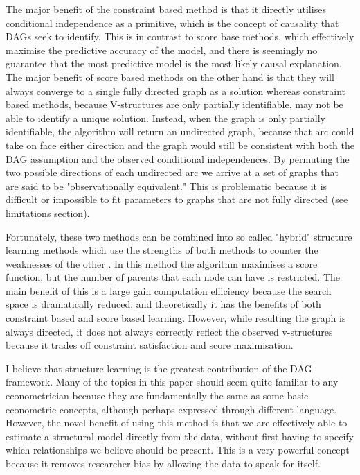 \documentclass{article}
\begin{document}
The major benefit of the constraint based method is that it directly utilises conditional independence as a primitive, which is the concept of causality that DAGs seek to identify. This is in contrast to score base methods, which effectively maximise the predictive accuracy of the model, and there is seemingly no guarantee that the most predictive model is the most likely causal explanation. The major benefit of score based methods on the other hand is that they will always converge to a single fully directed graph as a solution whereas constraint based methods, because V-structures are only partially identifiable, may not be able to identify a unique solution. Instead, when the graph is only partially identifiable, the algorithm will return an undirected graph, because that arc could take on face either direction and the graph would still be consistent with both the DAG assumption and the observed conditional independences. By permuting the two possible directions of each undirected arc we arrive at a set of graphs that are said to be "observationally equivalent." This is problematic because it is difficult or impossible to fit parameters to graphs that are not fully directed (see limitations section).  

Fortunately, these two methods can be combined into so called "hybrid" structure learning methods which use the strengths of both methods to counter the weaknesses of the other \parencite{scutari2014multiple} \parencite{friedman2013learning}. In this method the algorithm maximises a score function, but the number of parents that each node can have is restricted. The main benefit of this is a large gain computation efficiency because the search space is dramatically reduced, and theoretically it has the benefits of both constraint based and score based learning. However, while resulting the graph is always directed, it does not always correctly reflect the observed v-structures because it trades off constraint satisfaction and score maximisation.

I believe that structure learning is the greatest contribution of the DAG framework. Many of the topics in this paper should seem quite familiar to any econometrician because they are fundamentally the same as some basic econometric concepts, although perhaps expressed through different language. However, the novel benefit of using this method is that we are effectively able to estimate a structural model directly from the data, without first having to specify which relationships we believe should be present. This is a very powerful concept because it removes researcher bias by allowing the data to speak for itself.
\end{document}
